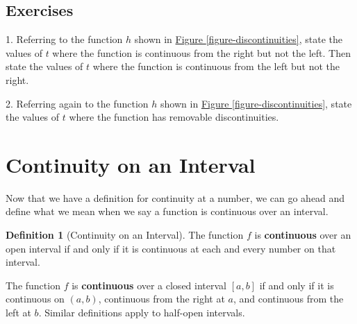 \documentclass[10pt,oneside,]{book}
\newcommand{\terminology}[1]{\textbf{#1}}
\theoremstyle{plain}
\theoremstyle{definition}
\newtheorem{definition}[theorem]{Definition}
\numberwithin{equation}{section}
\newcommand{\cinterval}[2]{\left[#1,#2\right]}
\newcommand{\ointerval}[2]{\left(#1,#2\right)}
\begin{document}
\subsection[Exercises]{Exercises}\label{exercises-14}
\begin{exerciselist}
\item[1.]\hypertarget{exercise-111}{\null}Referring to the function \(h\) shown in \hyperref[figure-discontinuities]{Figure \ref{figure-discontinuities}}, state the values of \(t\) where the function is continuous from the right but not the left. Then state the values of \(t\) where the function is continuous from the left but not the right.%
\par\smallskip
\item[2.]\hypertarget{exercise-112}{\null}Referring again to the function \(h\) shown in \hyperref[figure-discontinuities]{Figure \ref{figure-discontinuities}}, state the values of \(t\) where the function has removable discontinuities.%
\par\smallskip
\end{exerciselist}
\typeout{************************************************}
\typeout{************************************************}
\section[Continuity on an Interval]{Continuity on an Interval}\label{section-continuity-on-an-interval}
Now that we have a definition for continuity at a number, we can go ahead and define what we mean when we say a function is continuous over an interval.%
\begin{definition}[Continuity on an Interval]\label{definition-continuity-on-an-interval}
The function \(f\) is \terminology{continuous} over an open interval if and only if it is continuous at each and every number on that interval.%
\par
The function \(f\) is \terminology{continuous} over a closed interval \(\cinterval{a}{b}\) if and only if it is continuous on \(\ointerval{a}{b}\), continuous from the right at \(a\), and continuous from the left at \(b\). Similar definitions apply to half-open intervals.%
\end{definition}
\typeout{************************************************}
\typeout{************************************************}
\end{document}
